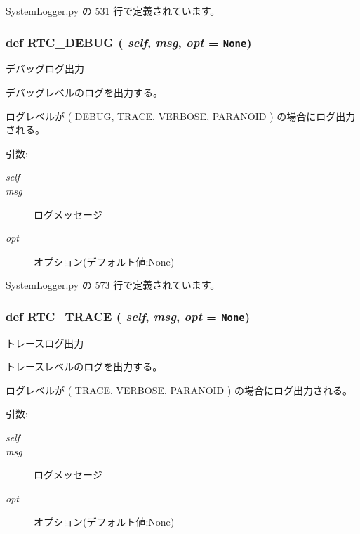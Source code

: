  SystemLogger.py の 531 行で定義されています。
\subsubsection{\setlength{\rightskip}{0pt plus 5cm}def RTC\_\-DEBUG ( {\em self},  {\em msg},  {\em opt} = {\tt None})}\label{classsource__py_1_1_system_logger_1_1_log_stream_9969a31c3d1e23ed55905d537bbd8b5e}


デバッグログ出力 

デバッグレベルのログを出力する。\par
ログレベルが ( DEBUG, TRACE, VERBOSE, PARANOID ) の場合にログ出力される。

\begin{Desc}
\item[引数:]
\begin{description}
\item[{\em self}]\item[{\em msg}]ログメッセージ \item[{\em opt}]オプション(デフォルト値:None) \end{description}
\end{Desc}


 SystemLogger.py の 573 行で定義されています。
\subsubsection{\setlength{\rightskip}{0pt plus 5cm}def RTC\_\-TRACE ( {\em self},  {\em msg},  {\em opt} = {\tt None})}\label{classsource__py_1_1_system_logger_1_1_log_stream_dbd3440036d1ea84fba8215d24646c19}


トレースログ出力 

トレースレベルのログを出力する。\par
ログレベルが ( TRACE, VERBOSE, PARANOID ) の場合にログ出力される。

\begin{Desc}
\item[引数:]
\begin{description}
\item[{\em self}]\item[{\em msg}]ログメッセージ \item[{\em opt}]オプション(デフォルト値:None) \end{description}
\end{Desc}


